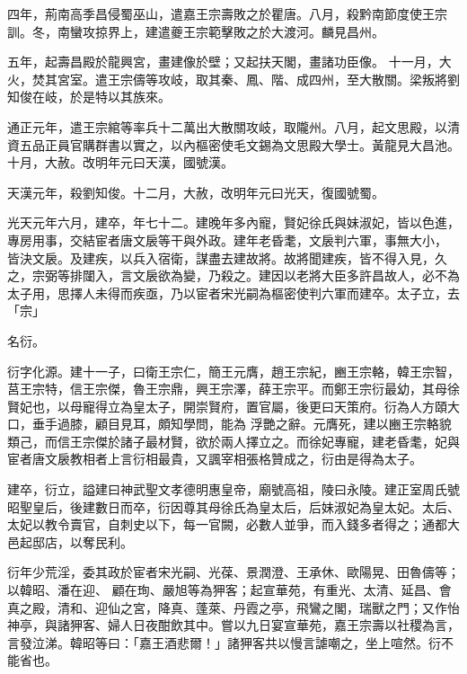 \begin{pinyinscope}
 四年，荊南高季昌侵蜀巫山，遣嘉王宗壽敗之於瞿唐。八月，殺黔南節度使王宗訓。冬，南蠻攻掠界上，建遣夔王宗範擊敗之於大渡河。麟見昌州。



 五年，起壽昌殿於龍興宮，畫建像於壁；又起扶天閣，畫諸功臣像。
 十一月，大火，焚其宮室。遣王宗儔等攻岐，取其秦、鳳、階、成四州，至大散關。梁叛將劉知俊在岐，於是特以其族來。



 通正元年，遣王宗綰等率兵十二萬出大散關攻岐，取隴州。八月，起文思殿，以清資五品正員官購群書以實之，以內樞密使毛文錫為文思殿大學士。黃龍見大昌池。十月，大赦。改明年元曰天漢，國號漢。



 天漢元年，殺劉知俊。十二月，大赦，改明年元曰光天，復國號蜀。



 光天元年六月，建卒，年七十二。建晚年多內寵，賢妃徐氏與妹淑妃，皆以色進，專房用事，交結宦者唐文扆等干與外政。建年老昏耄，文扆判六軍，事無大小，
 皆決文扆。及建疾，以兵入宿衛，謀盡去建故將。故將聞建疾，皆不得入見，久之，宗弼等排闥入，言文扆欲為變，乃殺之。建因以老將大臣多許昌故人，必不為太子用，思擇人未得而疾亟，乃以宦者宋光嗣為樞密使判六軍而建卒。太子立，去「宗」



 名衍。



 衍字化源。建十一子，曰衛王宗仁，簡王元膺，趙王宗紀，豳王宗輅，韓王宗智，莒王宗特，信王宗傑，魯王宗鼎，興王宗澤，薛王宗平。而鄭王宗衍最幼，其母徐賢妃也，以母寵得立為皇太子，開崇賢府，置官屬，後更曰天策府。衍為人方頤大口，垂手過膝，顧目見耳，頗知學問，能為
 浮艷之辭。元膺死，建以豳王宗輅貌類己，而信王宗傑於諸子最材賢，欲於兩人擇立之。而徐妃專寵，建老昏耄，妃與宦者唐文扆教相者上言衍相最貴，又諷宰相張格贊成之，衍由是得為太子。



 建卒，衍立，謚建曰神武聖文孝德明惠皇帝，廟號高祖，陵曰永陵。建正室周氏號昭聖皇后，後建數日而卒，衍因尊其母徐氏為皇太后，后妹淑妃為皇太妃。太后、太妃以教令賣官，自刺史以下，每一官闕，必數人並爭，而入錢多者得之；通都大邑起邸店，以奪民利。



 衍年少荒淫，委其政於宦者宋光嗣、光葆、景潤澄、王承休、歐陽晃、田魯儔等；以韓昭、潘在迎、
 顧在珣、嚴旭等為狎客；起宣華苑，有重光、太清、延昌、會真之殿，清和、迎仙之宮，降真、蓬萊、丹霞之亭，飛鸞之閣，瑞獸之門；又作怡神亭，與諸狎客、婦人日夜酣飲其中。嘗以九日宴宣華苑，嘉王宗壽以社稷為言，言發泣涕。韓昭等曰：「嘉王酒悲爾！」諸狎客共以慢言謔嘲之，坐上喧然。衍不能省也。




\end{pinyinscope}
